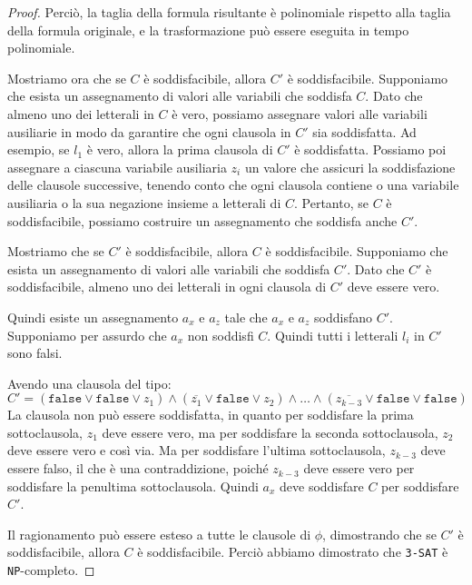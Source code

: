 \begin{proof}
    Perciò, la taglia della formula risultante è polinomiale rispetto alla taglia della
    formula originale, e la trasformazione può essere eseguita in tempo polinomiale.

    Mostriamo ora che se $C$ è soddisfacibile, allora $C'$ è soddisfacibile. Supponiamo
    che esista un assegnamento di valori alle variabili che soddisfa $C$.
    Dato che almeno uno dei letterali in $C$ è vero, possiamo assegnare valori
    alle variabili ausiliarie in modo da garantire che ogni clausola in $C'$ sia
    soddisfatta. Ad esempio, se $l_1$ è vero, allora la prima clausola di $C'$ è
    soddisfatta. Possiamo poi assegnare a ciascuna variabile ausiliaria $z_i$ un
    valore che assicuri la soddisfazione delle clausole successive, tenendo conto
    che ogni clausola contiene o una variabile ausiliaria o la sua negazione insieme
    a letterali di $C$. Pertanto,
    se $C$ è soddisfacibile, possiamo costruire un assegnamento che soddisfa anche $C'$.

    Mostriamo che se $C'$ è soddisfacibile, allora $C$ è soddisfacibile. Supponiamo che
    esista un assegnamento di valori alle variabili che soddisfa $C'$.
    Dato che $C'$ è soddisfacibile, almeno uno dei letterali in ogni clausola di $C'$
    deve essere vero.

    Quindi esiste un assegnamento $a_x$ e $a_z$ tale che $a_x$ e $a_z$ soddisfano $C'$.
    Supponiamo per assurdo che $a_x$ non soddisfi $C$. Quindi tutti i letterali $l_i$
    in $C'$ sono falsi.

    Avendo una clausola del tipo:
    \[
        C' = (\texttt{false} \lor \texttt{false} \lor z_1) 
        \land (\overline{z_1} \lor \texttt{false} \lor z_2) \land \ldots
        \land (\overline{z_{k-3}} \lor \texttt{false} \lor \texttt{false})
    \]
    La clausola non può essere soddisfatta, in quanto per soddisfare la prima 
    sottoclausola, $z_1$ deve essere vero, ma per soddisfare la seconda sottoclausola,
    $z_2$ deve essere vero e così via. Ma per soddisfare l'ultima sottoclausola,
    $z_{k-3}$ deve essere falso, il che è una contraddizione, poiché $z_{k-3}$ deve
    essere vero per soddisfare la penultima sottoclausola.
    Quindi $a_x$ deve soddisfare $C$ per soddisfare $C'$.

    Il ragionamento può essere esteso a tutte le clausole di $\phi$, dimostrando che
    se $C'$ è soddisfacibile, allora $C$ è soddisfacibile.
    Perciò abbiamo dimostrato che \texttt{3-SAT} è \texttt{NP}-completo.
\end{proof}

